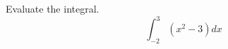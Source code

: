 \begin{exercise}
	Evaluate the integral.
	\begin{equation*}
	\int_{-2}^{3} \left( x^2 - 3 \right) dx
	\end{equation*}
\end{exercise}
